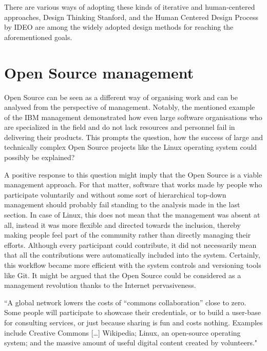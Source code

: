 There are various ways of adopting these kinds of iterative and human-centered approaches, Design Thinking Stanford, and the Human Centered Design Process by IDEO are among the widely adopted design methods for reaching the aforementioned goals.

\section{Open Source management}
\label{sec:OSManagement}

Open Source can be seen as a different way of organising work and can be analysed from the perspective of management. Notably, the mentioned example of the IBM management demonstrated how even large software organisations who are specialized in the field and do not lack resources and personnel fail in delivering their products. This prompts the question, how the success of large and technically complex Open Source projects like the Linux operating system could possibly be explained?

A positive response to this question might imply that the Open Source is a viable management approach. For that matter, software that works made by people who participate voluntarily and without some sort of hierarchical top-down management should probably fail standing to the analysis made in the last section. In case of Linux, this does not mean that the management was absent at all, instead it was more flexible and directed towards the inclusion, thereby making people feel part of the community rather than directly managing their efforts. Although every participant could contribute, it did not necessarily mean that all the contributions were automatically included into the system. Certainly, this workflow became more efficient with the system controls and versioning tools like Git.
It might be argued that the Open Source could be considered as a management revolution thanks to the Internet pervasiveness. 

\begin{displayquote}
    “A global network lowers the costs of “commons collaboration” close to zero. Some people will participate to showcase their credentials, or to build a user-base for consulting services, or just because sharing is fun and costs nothing. Examples include Creative Commons […] Wikipedia; Linux, an open-source operating system; and the massive amount of useful digital content created by volunteers."
\end{displayquote}

